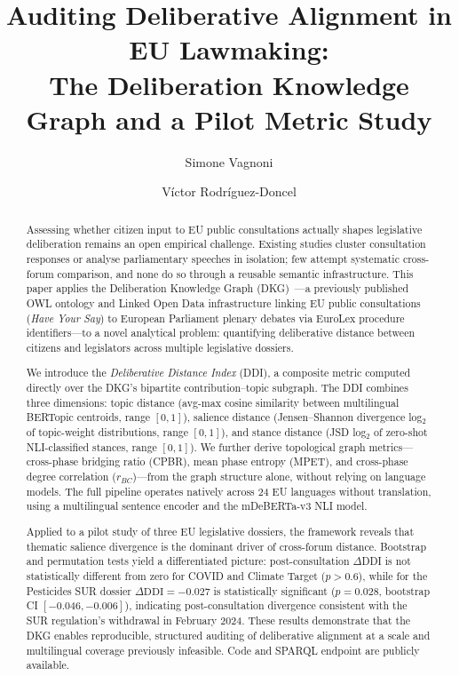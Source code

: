\documentclass[sigconf,natbib]{acmart}
\begin{document}
\title{Auditing Deliberative Alignment in EU Lawmaking:\\
The Deliberation Knowledge Graph and a Pilot Metric Study}

\author{Simone Vagnoni}

\author{V\'ictor Rodr\'iguez-Doncel}

\begin{abstract}
Assessing whether citizen input to EU public consultations actually shapes legislative deliberation remains an open empirical challenge.
Existing studies cluster consultation responses or analyse parliamentary speeches in isolation; few attempt systematic cross-forum comparison, and none do so through a reusable semantic infrastructure.
This paper applies the Deliberation Knowledge Graph (DKG)~\cite{Vagnoni2026}---a previously published OWL ontology and Linked Open Data infrastructure linking EU public consultations (\textit{Have Your Say}) to European Parliament plenary debates via EuroLex procedure identifiers---to a novel analytical problem: quantifying deliberative distance between citizens and legislators across multiple legislative dossiers.

We introduce the \textit{Deliberative Distance Index} (DDI), a composite metric computed directly over the DKG's bipartite contribution--topic subgraph.
The DDI combines three dimensions: topic distance (avg-max cosine similarity between multilingual BERTopic centroids, range $[0,1]$), salience distance (Jensen--Shannon divergence log$_2$ of topic-weight distributions, range $[0,1]$), and stance distance (JSD log$_2$ of zero-shot NLI-classified stances, range $[0,1]$).
We further derive topological graph metrics---cross-phase bridging ratio (CPBR), mean phase entropy (MPET), and cross-phase degree correlation ($r_{BC}$)---from the graph structure alone, without relying on language models.
The full pipeline operates natively across 24 EU languages without translation, using a multilingual sentence encoder and the mDeBERTa-v3 NLI model.

Applied to a pilot study of three EU legislative dossiers, the framework reveals that thematic salience divergence is the dominant driver of cross-forum distance.
Bootstrap and permutation tests yield a differentiated picture: post-consultation $\Delta$DDI is not statistically different from zero for COVID and Climate Target ($p > 0.6$), while for the Pesticides SUR dossier $\Delta\text{DDI} = -0.027$ is statistically significant ($p = 0.028$, bootstrap CI $[-0.046, -0.006]$), indicating post-consultation divergence consistent with the SUR regulation's withdrawal in February 2024.
These results demonstrate that the DKG enables reproducible, structured auditing of deliberative alignment at a scale and multilingual coverage previously infeasible.
Code and SPARQL endpoint are publicly available.
\end{abstract}
\end{document}
